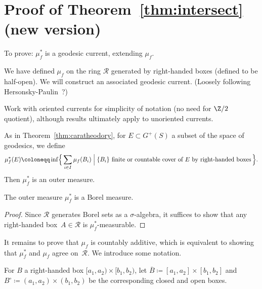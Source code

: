 \section{Proof of Theorem~\ref{thm:intersect} (new version)}
\label{sec:proof-new}

To prove: $\mu_f^*$ is a geodesic current, extending $\mu_f$.

We have defined $\mu_f$ on the ring $\mathcal{R}$ generated by
right-handed boxes (defined to be half-open). We will construct an
associated geodesic current. (Loosely following
Hersonsky-Paulin~\cite{HP97:RigidityNegCurvedCone}?)

Work with oriented currents for simplicity of notation (no need for
$\Z/2$ quotient), although results ultimately apply to unoriented
currents.

As in Theorem~\ref{thm:caratheodory}, for $E \subset G^+(S)$ a subset
of the space of geodesics, we define
\[
    \mu_f^*(E) \coloneqq \inf \Bigl\{\, \sum_{i \in I} \mu_f(B_i) \Bigm| \text{$\{B_i\}$
          finite or countable cover of $E$ by right-handed boxes}\,\Bigr\}.
\]
Then $\mu_f^*$ is an outer measure.

\begin{lemma}
  The outer measure $\mu_f^*$ is a Borel measure.
\end{lemma}

\begin{proof}
  Since $\mathcal{R}$ generates Borel sets as a $\sigma$-algebra, it
  suffices to show that any right-handed box~$A \in \mathcal{R}$ is
  $\mu_f^*$-measurable.
\end{proof}

It remains to prove that $\mu_f$ is countably additive, which is
equivalent to showing that $\mu_f^*$ and $\mu_f$ agree
on~$\mathcal{R}$. We introduce some notation.

For $B$ a right-handed box $[a_1,a_2) \times [b_1,b_2)$, let
$\overline{B} \coloneqq [a_1,a_2] \times [b_1,b_2]$ and
$B^\circ \coloneqq (a_1,a_2) \times (b_1,b_2)$ be the corresponding
closed and open boxes.

